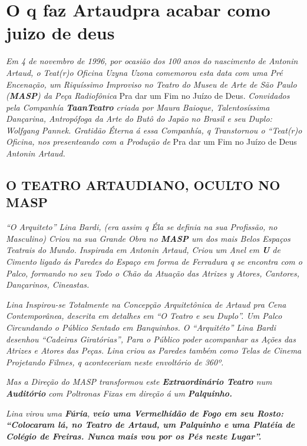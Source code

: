\chapter[\mbox{O q faz Artaud pra acabar com o juizo de deus}\\por José Celso Martinez Corrêa]{O q faz Artaud\break pra acabar com\break o juizo de deus}


\emph{Em 4 de novembro de 1996, por ocasião dos 100 anos do nascimento
de Antonin Artaud, o Teat(r)o Oficina Uzyna Uzona comemorou esta data
com uma Pré Encenação, um Riquíssimo Improviso no Teatro do Museu de
Arte de São Paulo (\textbf{MASP}) da Peça Radiofônica} Pra dar
um Fim no Juízo de Deus. \emph{Convidados pela Companhía
\textbf{TaanTeatro} criada por Maura Baioque, Talentosíssima
Dançarina, Antropófoga da Arte do Butô do Japão no Brasil e seu Duplo:
Wolfgang Pannek. Gratidão Éterna á essa Companhía, q
Transtornou o ``Teat(r)o Oficina, nos presenteando com a Produção de}
Pra dar um Fim no Juízo de Deus \emph{Antonin Artaud.}

\section*{O TEATRO ARTAUDIANO, OCULTO NO MASP}

\emph{``O Arquiteto'' Lina Bardi, (era assim q Éla se definia
na sua Profissão, no Masculino) Criou na sua Grande Obra no
\textbf{MASP} um dos mais Belos Espaços Teatrais do Mundo. Inspirada em
Antonin Artaud, Criou um Anel em \textbf{U} de Cimento ligado ás Paredes
do Espaço em forma de Ferradura q se encontra com o Palco, formando no
seu Todo o Chão da Atuação das Atrizes y Atores, Cantores, Dançarinos,
Cineastas.}

\emph{Lina Inspirou-se Totalmente na Concepção Arquitetônica de Artaud
pra Cena Contemporânea, descrita em detalhes em ``O Teatro e seu
Duplo''. Um Palco Circundando o Público Sentado em Banquinhos. O
``Arquitéto'' Lina Bardi desenhou ``Cadeiras Giratórias'', Para o
Público poder acompanhar as Ações das Atrizes e Atores das Peças. Lina
criou as Paredes também como Telas de Cinema Projetando Filmes, q
aconteceriam neste envoltório de 360º.}

\emph{Mas a Direção do MASP transformou este \textbf{Extraordinário
Teatro} num \textbf{Auditório} com Poltronas Fixas em direção á um
\textbf{Palquinho.}}

\emph{Lina virou uma \textbf{Fúria}, \textbf{veio uma Vermelhidão de
Fogo em seu Rosto: ``Colocaram lá, no Teatro de Artaud, um Palquinho e
uma Platéia de Colégio de Freiras. Nunca mais vou por os Pés neste
Lugar''.}}

